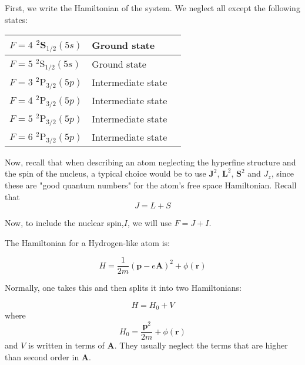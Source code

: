 First, we write the Hamiltonian of the system. We neglect all except the following states: %
\begin{center}
\begin{tabular}{|l|l|||r|}
\hline
$F=4$ $^2$S$_{1/2} (5s)$ & Ground state  \\ \hline
$F=5$ $^2$S$_{1/2} (5s)$ & Ground state  \\ \hline
$F=3$ $^2$P$_{3/2} (5p)$ & Intermediate state  \\ \hline
$F=4$ $^2$P$_{3/2} (5p)$ & Intermediate state  \\ \hline
$F=5$ $^2$P$_{3/2} (5p)$ & Intermediate state  \\ \hline
$F=6$ $^2$P$_{3/2} (5p)$ & Intermediate state  \\ \hline
\end{tabular}
\end{center}

Now, recall that when describing an atom neglecting the hyperfine structure and the spin of the nucleus, a typical choice would be to use $\mathbf{J}^2$, $\mathbf{L}^2$, $\mathbf{S}^2$ and $J_z$, since these are "good quantum numbers" for the atom's free space Hamiltonian. Recall that 
\begin{equation}
J=L+S
\end{equation}

Now, to include the nuclear spin,$I$, we will use $F=J+I$. 

The Hamiltonian for a Hydrogen-like atom is: 

\begin{equation}
H=\frac{1}{2m}(\mathbf{p}-e\mathbf{A})^2+\phi(\mathbf{r})
\end{equation}

Normally, one takes this and then splits it into two Hamiltonians: 

\begin{equation}
H=H_0+V
\end{equation}
where 
\begin{equation}
H_0=\frac{\mathbf{p}^2}{2m}+\phi(\mathbf{r})
\end{equation}
and $V$ is written in terms of $\mathbf{A}$. They usually neglect the terms that are higher than second order in $\mathbf{A}$.

